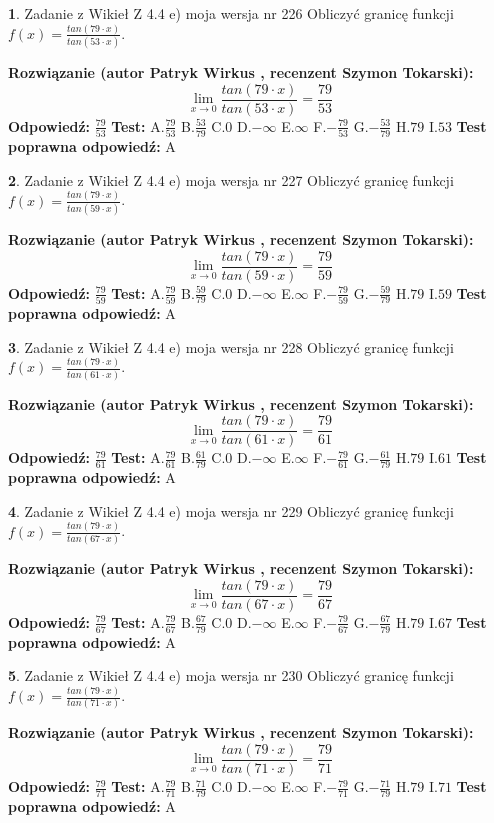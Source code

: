 \documentclass[12pt, a4paper]{article}
\theoremstyle{definition} %
\newtheorem{zad}{}
\newcommand{\zadStart}[1]{\begin{zad}#1\newline}
\newcommand{\zadStop}{\end{zad}}
\newcommand{\rozwStart}[2]{\noindent \textbf{Rozwiązanie (autor #1 , recenzent #2): }\newline}
\newcommand{\rozwStop}{\newline}
\newcommand{\odpStart}{\noindent \textbf{Odpowiedź:}\newline}
\newcommand{\odpStop}{\newline}
\newcommand{\testStart}{\noindent \textbf{Test:}\newline}
\newcommand{\testStop}{\newline}
\newcommand{\kluczStart}{\noindent \textbf{Test poprawna odpowiedź:}\newline}
\newcommand{\kluczStop}{\newline}
\begin{document}
\zadStart{Zadanie z Wikieł Z 4.4 e) moja wersja nr 226}
Obliczyć granicę funkcji $f(x)=\frac{tan(79\cdot x)}{tan(53\cdot x)}$.
\zadStop
\rozwStart{Patryk Wirkus}{Szymon Tokarski}
$$\lim\limits_{x\to 0}\frac{tan(79\cdot x)}{tan(53\cdot x)}=
\frac{79}{53}$$
\rozwStop
\odpStart
$\frac{79}{53}$
\odpStop
\testStart
A.$\frac{79}{53}$
B.$\frac{53}{79}$
C.$0$
D.$-\infty$
E.$\infty$
F.$-\frac{79}{53}$
G.$-\frac{53}{79}$
H.$79$
I.$53$
\testStop
\kluczStart
A
\kluczStop



\zadStart{Zadanie z Wikieł Z 4.4 e) moja wersja nr 227}
Obliczyć granicę funkcji $f(x)=\frac{tan(79\cdot x)}{tan(59\cdot x)}$.
\zadStop
\rozwStart{Patryk Wirkus}{Szymon Tokarski}
$$\lim\limits_{x\to 0}\frac{tan(79\cdot x)}{tan(59\cdot x)}=
\frac{79}{59}$$
\rozwStop
\odpStart
$\frac{79}{59}$
\odpStop
\testStart
A.$\frac{79}{59}$
B.$\frac{59}{79}$
C.$0$
D.$-\infty$
E.$\infty$
F.$-\frac{79}{59}$
G.$-\frac{59}{79}$
H.$79$
I.$59$
\testStop
\kluczStart
A
\kluczStop



\zadStart{Zadanie z Wikieł Z 4.4 e) moja wersja nr 228}
Obliczyć granicę funkcji $f(x)=\frac{tan(79\cdot x)}{tan(61\cdot x)}$.
\zadStop
\rozwStart{Patryk Wirkus}{Szymon Tokarski}
$$\lim\limits_{x\to 0}\frac{tan(79\cdot x)}{tan(61\cdot x)}=
\frac{79}{61}$$
\rozwStop
\odpStart
$\frac{79}{61}$
\odpStop
\testStart
A.$\frac{79}{61}$
B.$\frac{61}{79}$
C.$0$
D.$-\infty$
E.$\infty$
F.$-\frac{79}{61}$
G.$-\frac{61}{79}$
H.$79$
I.$61$
\testStop
\kluczStart
A
\kluczStop



\zadStart{Zadanie z Wikieł Z 4.4 e) moja wersja nr 229}
Obliczyć granicę funkcji $f(x)=\frac{tan(79\cdot x)}{tan(67\cdot x)}$.
\zadStop
\rozwStart{Patryk Wirkus}{Szymon Tokarski}
$$\lim\limits_{x\to 0}\frac{tan(79\cdot x)}{tan(67\cdot x)}=
\frac{79}{67}$$
\rozwStop
\odpStart
$\frac{79}{67}$
\odpStop
\testStart
A.$\frac{79}{67}$
B.$\frac{67}{79}$
C.$0$
D.$-\infty$
E.$\infty$
F.$-\frac{79}{67}$
G.$-\frac{67}{79}$
H.$79$
I.$67$
\testStop
\kluczStart
A
\kluczStop



\zadStart{Zadanie z Wikieł Z 4.4 e) moja wersja nr 230}
Obliczyć granicę funkcji $f(x)=\frac{tan(79\cdot x)}{tan(71\cdot x)}$.
\zadStop
\rozwStart{Patryk Wirkus}{Szymon Tokarski}
$$\lim\limits_{x\to 0}\frac{tan(79\cdot x)}{tan(71\cdot x)}=
\frac{79}{71}$$
\rozwStop
\odpStart
$\frac{79}{71}$
\odpStop
\testStart
A.$\frac{79}{71}$
B.$\frac{71}{79}$
C.$0$
D.$-\infty$
E.$\infty$
F.$-\frac{79}{71}$
G.$-\frac{71}{79}$
H.$79$
I.$71$
\testStop
\kluczStart
A
\kluczStop
\end{document}
